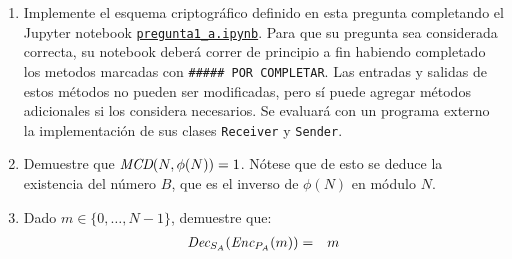    \begin{enumerate}
\item Implemente el esquema criptográfico definido en esta pregunta
  completando el Jupyter notebook
  \href{https://github.com/IIC3253/2023/blob/main/tareas/tarea\%202/enunciado/questions/p1/pregunta1_a.ipynb}{\texttt{pregunta1\_a.ipynb}}. Para
  que su pregunta sea considerada correcta, su notebook deberá correr
  de principio a fin habiendo completado los metodos marcadas con
  \texttt{\#\#\#\#\# POR COMPLETAR}. Las entradas y salidas de estos
  métodos no pueden ser modificadas, pero sí puede agregar métodos
  adicionales si los considera necesarios. Se
  evaluará con un programa externo la implementación de sus clases
  \texttt{Receiver} y \texttt{Sender}.
  
  \item Demuestre que $\textit{MCD}(N, \phi(N)) = 1$. Nótese que de esto
    se deduce la existencia del número $B$, que es el inverso
    de $\phi(N)$ en módulo $N$.

\item Dado     $m \in \{0, \ldots, N-1\}$, demuestre que:
  \begin{eqnarray*}
    \textit{Dec}_{S_A}(\textit{Enc}_{P_A}(m)) &=& m
  \end{eqnarray*}
  \end{enumerate}
